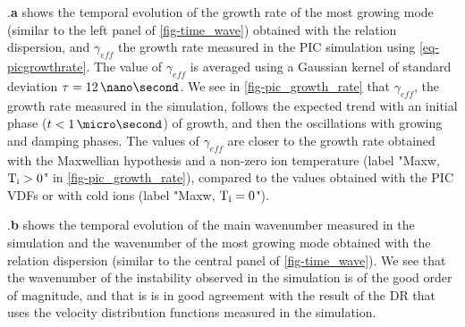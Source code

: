     
    .{\bf a} shows the temporal evolution of the growth rate of the most growing mode (similar to the left panel of \cref{fig-time_wave}) obtained with the relation dispersion, and $\gamma_{eff}$ the growth rate measured in the \ac{PIC} simulation using \cref{eq-picgrowthrate}.
    The value of $\gamma_{eff}$ is averaged using a Gaussian kernel of standard deviation $\tau = 12\,\nano\second$.
    We see in \cref{fig-pic_growth_rate} that $\gamma_{eff}$, the growth rate measured in the simulation, follows the expected trend with an initial phase ($t<1\,\micro\second$) of growth, and then the oscillations with growing and damping phases.
    The values of $\gamma_{eff}$ are closer to the growth rate obtained with the Maxwellian hypothesis and a non-zero ion temperature (label "Maxw, $\mathrm{T_i}>0$" in \cref{fig-pic_growth_rate}), compared to the values obtained with the \ac{PIC} VDFs or with cold ions (label "Maxw, $\mathrm{T_i}=0$").
    
    .{\bf b}  shows the temporal evolution of the main wavenumber measured in the simulation and the wavenumber of the most growing mode obtained with the relation dispersion (similar to the central panel of \cref{fig-time_wave}).
    We see that the wavenumber of the instability observed in the simulation is of the good order of magnitude, and that is is in good agreement with the result of the \ac{DR} that uses the velocity distribution functions measured in the simulation.
      
